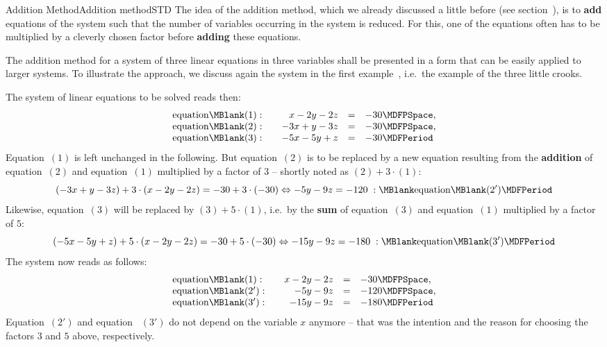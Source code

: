 \begin{MXContent}{Addition Method}{Addition method}{STD}
The idea of the addition method, which we already discussed a little before (see
section~), is to \textbf{add} equations of the system such that
the number of variables occurring in the system is reduced. For this, one 
of the equations often has to be multiplied by a cleverly chosen factor before 
\textbf{adding} these equations.

The addition method for a system of three linear equations in three variables 
shall be presented in a form that can be easily applied to larger systems. 
To illustrate the approach, we discuss again the system in the first
example~, i.e.\ the example of the 
three little crooks.

\begin{MExample}
The system of linear equations to be solved reads then:
$$\begin{array}{lcrcl} \mbox{equation}\MBlank (1): & & x - 2 y - 2 z & = & - 30 \MDFPSpace, \\
\mbox{equation}\MBlank (2): & & - 3 x + y - 3 z & = & - 30 \MDFPSpace, \\
\mbox{equation}\MBlank (3): & & - 5 x - 5 y + z & = & - 30 \MDFPeriod \end{array}$$
Equation~$(1)$ is left unchanged in the following. 
But equation~$(2)$ is to be replaced by a new equation resulting from the 
\textbf{addition} of equation~$(2)$ and equation~$(1)$ multiplied by a factor of 
$3$ -- shortly noted as $(2) + 3 \cdot (1)$:
$$(-3 x + y - 3 z) + 3 \cdot (x - 2 y - 2 z) = - 30 + 3 \cdot (- 30) \Leftrightarrow
- 5 y - 9 z = - 120 \; : \MBlank\mbox{equation}\MBlank (2') \MDFPeriod $$
Likewise, equation~$(3)$ will be replaced by $(3) + 5 \cdot (1)$, i.e.\
by the \textbf{sum} of equation~$(3)$ and equation~$(1)$ multiplied by a factor of $5$:
$$(- 5 x - 5 y + z) + 5 \cdot (x - 2 y - 2 z) = - 30 + 5 \cdot (- 30) \Leftrightarrow
-15 y - 9 z = - 180 \; : \MBlank\mbox{equation}\MBlank (3') \MDFPeriod $$
The system now reads as follows:
$$\begin{array}{lcrcl} \mbox{equation}\MBlank (1): & & x - 2 y - 2 z & = & - 30 \MDFPSpace, \\
\mbox{equation}\MBlank (2'): & & - 5 y - 9 z & = & - 120 \MDFPSpace, \\
\mbox{equation}\MBlank (3'): & & - 15 y - 9 z & = & - 180  \MDFPeriod \end{array}$$
Equation~$(2')$ and equation~ $(3')$ do not depend on the variable $x$ anymore --
that was the intention and the reason for choosing the factors $3$ and $5$ above, respectively.


\end{MExample}
\end{MXContent}
